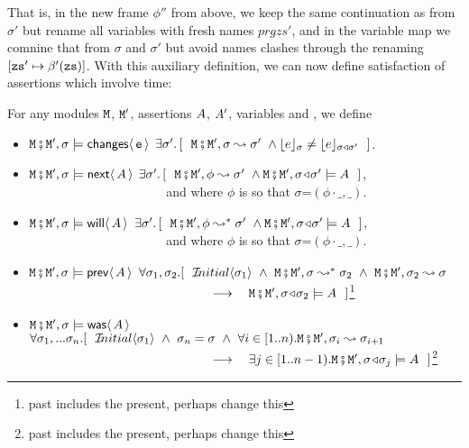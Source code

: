 That is, in the new frame $\phi''$ from above, we keep the same continuation as from $\sigma'$ but rename all
variables with fresh names $prg{zs}'$, and in the variable map we comnine that from $\sigma$ and $\sigma'$
but avoid names clashes through the renaming $[\prg{zs}'\mapsto \varMap'(\prg{zs})]$.
With this auxiliary definition, we can now define satisfaction of assertions which involve time:


\begin{definition}  \label{def:valid:assertion:time}
For any modules $\M$, $\M'$, assertions $\A$, $\A'$, variables  and , we define
  
\begin{itemize}
 \item
 $\M\mkpair \M', \sigma \models   \Changes{\prg{e}}$  \IFF
 $\exists \sigma'.\, [\ \ \M\mkpair \M',\sigma \leadsto \sigma' \ \wedge \interp{e}{\sigma} \neq \interp{e}{\sigma\triangleleft \sigma'} \ \  ]$.
 \item
  $\M\mkpair \M', \sigma \models  \Next \A $
  \IFF
  $\exists \sigma'.\, [\ \ \M\mkpair \M',\phi \leadsto  \sigma' \ \wedge \M\mkpair \M',\sigma\adapt\sigma' \models \A \ \  ]$,
 \\
$\strut ~ \hspace{1.4in} $  and where $\phi$ is
so that $\sigma$=$(\phi\cdot\_,\_)$.\item
  $\M\mkpair \M', \sigma \models  \Future \A $
  \IFF
  $\exists \sigma'.\, [\ \ \M\mkpair \M',\phi \leadsto^* \sigma' \ \wedge \M\mkpair \M',\sigma\adapt\sigma' \models \A \ \  ]$,
 \\
$\strut ~ \hspace{1.4in} $  and where $\phi$ is
so that $\sigma$=$(\phi\cdot\_,\_)$.  
  \item
 $\M\mkpair \M', \sigma \models  \Prev \A $ \IFF
 $\forall \sigma_1, \sigma_2. [\ \ \Initial{\sigma_1}\ \wedge \   \M\mkpair \M', \sigma  \leadsto^*  \sigma_2 \ \wedge \   \M\mkpair \M', \sigma_2  \leadsto   \sigma  
$
 \\
$\strut ~ \hspace{1.9in} $  $ \longrightarrow \ \ \   
 \M\mkpair \M', \sigma\adapt\sigma_2  \models \A\ \
 ]$\footnote{past includes the present, perhaps change this}
 \item
 $\M\mkpair \M', \sigma \models  \Past \A $ \IFF
 $\forall \sigma_1, ... \sigma_n. [\ \ \Initial{\sigma_1}\ \wedge \  \sigma_n=\sigma 
  \ \wedge \ \forall i\in[1..n). \M\mkpair \M', \sigma_{i} \leadsto  \sigma_{i+1}
$
 \\
$\strut ~ \hspace{1.9in} $  $ \longrightarrow \ \ \  \exists j\in [1..n-1).
 \M\mkpair \M', \sigma\adapt\sigma_j  \models \A\ \
 ]$\footnote{past includes the present, perhaps change this}
\end{itemize}
\end{definition}

